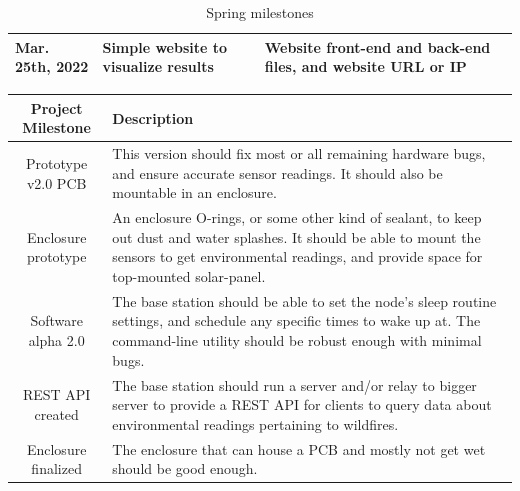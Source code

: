 \documentclass{article}
\begin{document}
\begin{table}[H]
\begin{tabularx}{\linewidth}{|X|X|X|}
        \hline
        Mar. 25th, 2022
        & Simple website to visualize results
        & Website front-end and back-end files, and website URL or IP
        \\
        
        
        \hline
    \end{tabularx}
    \caption{Spring milestones}
\end{table}
%
%
\begin{table}[H]    
    \centering
    \begin{tabularx}{\linewidth}{|c|X|}
        \hline
        Project Milestone & Description 
        \\
        \hline\hline
        Prototype v2.0 PCB 
        & This version should fix most or all remaining hardware bugs, and ensure accurate sensor readings. It should also be mountable in an enclosure.
        \\
        
        \hline
        Enclosure prototype
        & An enclosure O-rings, or some other kind of sealant, to keep out dust and water splashes. It should be able to mount the sensors to get environmental readings, and provide space for top-mounted solar-panel.
        \\
        
        \hline
        Software alpha 2.0 
        & The base station should be able to set the node's sleep routine settings, and schedule any specific times to wake up at. The command-line utility should be robust enough with minimal bugs.
        \\
        
        \hline
        REST API created
        & The base station should run a server and/or relay to bigger server to provide a REST API for clients to query data about environmental readings pertaining to wildfires.
        \\
        
        \hline
        Enclosure finalized
        & The enclosure that can house a PCB and mostly not get wet should be good enough.
        \\
        

\end{tabularx}
\end{table}
\end{document}
